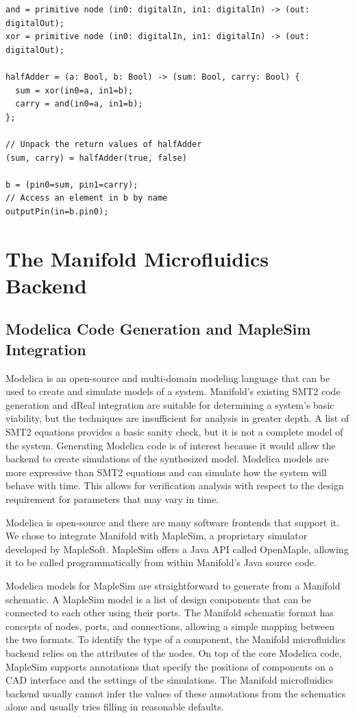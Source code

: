\begin{lstlisting}[label=lst:unpacking, caption=Examples of new tuple features]
and = primitive node (in0: digitalIn, in1: digitalIn) -> (out: digitalOut);
xor = primitive node (in0: digitalIn, in1: digitalIn) -> (out: digitalOut);

halfAdder = (a: Bool, b: Bool) -> (sum: Bool, carry: Bool) {
  sum = xor(in0=a, in1=b);
  carry = and(in0=a, in1=b);
};

// Unpack the return values of halfAdder
(sum, carry) = halfAdder(true, false)

b = (pin0=sum, pin1=carry);
// Access an element in b by name
outputPin(in=b.pin0);
\end{lstlisting}

\section{The Manifold Microfluidics Backend}

\subsection{Modelica Code Generation and MapleSim Integration}

Modelica is an open-source and multi-domain modeling language that can be used
to create and simulate models of a system. \cite{Maplesim}\cite{modelica}
Manifold's existing SMT2 code generation and dReal integration are suitable for
determining a system's basic viability, but the techniques are insufficient for
analysis in greater depth.
A list of SMT2 equations provides a basic sanity check, but it is not a complete model of the system.
Generating Modelica code is of interest because it would allow the backend to create simulations of the synthesized model.
Modelica models are more expressive than SMT2 equations and can simulate how the system will behave with time. 
This allows for verification analysis
with respect to the design requirement for parameters that may vary in time.

Modelica is open-source and there are many software frontends that support it.
We chose to integrate Manifold with MapleSim, a proprietary simulator developed by MapleSoft.
MapleSim offers a Java API called OpenMaple, allowing it to be called programmatically from within Manifold's Java source code.

Modelica models for MapleSim are straightforward to generate from a Manifold schematic.
A MapleSim model is a list of design components that can be connected to each other using their ports.
The Manifold schematic format has concepts of nodes, ports, and connections, allowing a simple mapping between the two formats.
To identify the type of a component, the Manifold microfluidics backend relies on the attributes of the nodes.
On top of the core Modelica code, MapleSim supports annotations that specify the positions of components on a CAD interface and the settings of the simulations.
The Manifold microfluidics backend usually cannot infer the values of these annotations from the schematics alone and usually tries filling in reasonable defaults.

